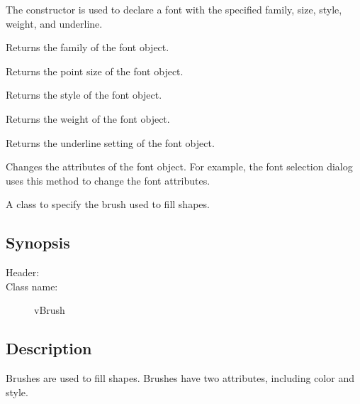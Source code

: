 
The constructor is used to declare a font with the specified
family, size, style, weight, and underline.


Returns the family of the font object.


Returns the point size of the font object.


Returns the style of the font object.


Returns the weight of the font object.


Returns the underline setting of the font object.


Changes the attributes of the font object. For example, the font
selection dialog uses this method to change the font attributes.



A class to specify the brush used to fill shapes.

\subsection* {Synopsis}

\begin{description}
	\item [Header:] 
	\item [Class name:] vBrush
\end{description}

\subsection* {Description}

Brushes are used to fill shapes. Brushes have
two attributes, including color and style.

